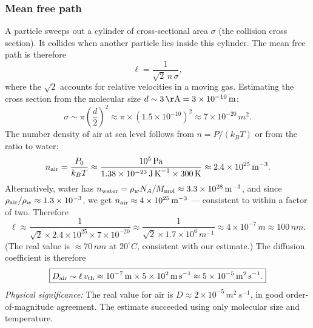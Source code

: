 \subsubsection*{Mean free path}
A particle sweeps out a cylinder of cross-sectional area $\sigma$ (the
collision cross section). It collides when another particle lies inside this
cylinder. The mean free path is therefore
\begin{equation}
    \ell = \frac{1}{\sqrt{2}\,n\,\sigma} ,
    \label{eq:lec06:mean-free-path}
\end{equation}
where the $\sqrt{2}$ accounts for relative velocities in a moving gas.
Estimating the cross section from the molecular size $d \sim 3\,\si{\AA} =
3\times10^{-10}\,\si{m}$:
\begin{equation}
    \sigma \sim \pi\!\left(\frac{d}{2}\right)^{\!2}
    \approx \pi\times(1.5\times10^{-10})^2
    \approx 7\times10^{-20}\,\si{m^2} .
    \label{eq:lec06:sigma-molecule}
\end{equation}
The number density of air at sea level follows from $n = P/(k_B T)$ or from
the ratio to water:
\begin{equation}
    n_{\rm air}
    = \frac{P_0}{k_B T}
    \approx \frac{10^5\,\si{Pa}}{1.38\times10^{-23}\,\si{J\,K^{-1}}\times300\,\si{K}}
    \approx 2.4\times10^{25}\,\si{m^{-3}} .
    \label{eq:lec06:nair}
\end{equation}
Alternatively, water has $n_{\rm water} = \rho_w N_A / M_{\rm mol} \approx
3.3\times10^{28}\,\si{m^{-3}}$, and since $\rho_{\rm air}/\rho_w \approx
1.3\times10^{-3}$, we get $n_{\rm air} \approx 4\times10^{25}\,\si{m^{-3}}$
— consistent to within a factor of two. Therefore
\begin{equation}
    \ell
    \approx \frac{1}{\sqrt{2}\times2.4\times10^{25}\times7\times10^{-20}}
    \approx \frac{1}{\sqrt{2}\times1.7\times10^6\,\si{m^{-1}}}
    \approx 4\times10^{-7}\,\si{m} \approx 100\,\si{nm} .
    \label{eq:lec06:mfp-air}
\end{equation}
(The real value is $\approx 70\,\si{nm}$ at $20^\circ\si{C}$, consistent with
our estimate.) The diffusion coefficient is therefore
\begin{equation}
    \boxed{
    D_{\rm air} \sim \ell\,v_{\rm th}
    \approx 10^{-7}\,\si{m}\times5\times10^{2}\,\si{m\,s^{-1}}
    \approx 5\times10^{-5}\,\si{m^2\,s^{-1}} .
    }
    \label{eq:lec06:Dair}
\end{equation}
\textit{Physical significance:} The real value for air is
$D \approx 2\times10^{-5}\,\si{m^2\,s^{-1}}$, in good order-of-magnitude
agreement. The estimate succeeded using only molecular size and temperature.

